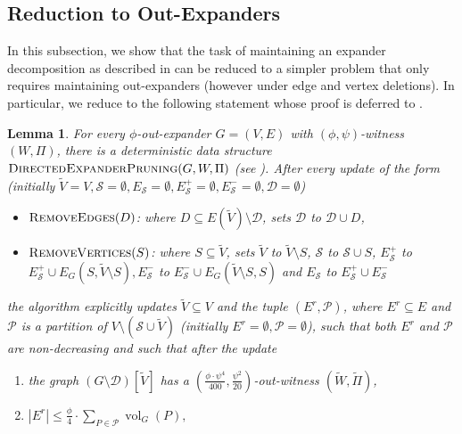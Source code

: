 \documentclass[11pt]{article}
\newtheorem{lemma}[theorem]{Lemma}
\begin{document}
\subsection{Reduction to Out-Expanders}

In this subsection, we show that the task of maintaining an expander decomposition as described in  can be reduced to a simpler problem that only requires maintaining out-expanders (however under edge and vertex deletions). In particular, we reduce to the following statement whose proof is deferred to .

\begin{lemma}\label{lm:DirectedExpanderDecomp}For every $\phi$-out-expander $G = (V, E)$ with $(\phi,\psi)$-witness $(W, \Pi)$, there is a deterministic data structure $\textsc{DirectedExpanderPruning}(G, W, \Pi)$ (see ). After every update of the form (initially $\tilde{V} = V, \mathcal{S} = \emptyset, E_{\mathcal{S}} = \emptyset, E_{\mathcal{S}}^+ = \emptyset, E_{\mathcal{S}}^- = \emptyset, \mathcal{D} = \emptyset$)
\begin{itemize}
    \item $\textsc{RemoveEdges}(D)$: where $D \subseteq E(\tilde{V}) \setminus \mathcal{D}$, sets $\mathcal{D}$ to $\mathcal{D} \cup D$,
    \item $\textsc{RemoveVertices}(S)$: where $S \subseteq \tilde{V}$, sets $\tilde{V}$ to $\tilde{V} \setminus S$, $\mathcal{S}$ to $\mathcal{S} \cup S$, $E_{\mathcal{S}}^+$ to $E_{\mathcal{S}}^+ \cup E_G(S, \tilde{V} \setminus S), E_{\mathcal{S}}^-$ to $E_{\mathcal{S}}^- \cup E_G(\tilde{V} \setminus S, S)$ and $E_{\mathcal{S}}$ to $E_{\mathcal{S}}^+ \cup E_{\mathcal{S}}^-$
\end{itemize}
the algorithm explicitly updates $\tilde{V} \subseteq V$ and the tuple $(E^r, \mathcal{P})$, where $E^r \subseteq E$ and $\mathcal{P}$ is a partition of $V \setminus \left(\mathcal{S} \cup \tilde{V}\right)$ (initially $E^r = \emptyset, \mathcal{P} = \emptyset$), such that both $E^r$ and $\mathcal{P}$ are non-decreasing and such that after the update 
\begin{enumerate}
    \item \label{itm:DEP-lm1} the graph $\left(G \setminus \mathcal{D}\right)\left[\tilde{V}\right]$ has a $\left(\frac{\phi \cdot \psi^4}{400}, \frac{\psi^2}{20}\right)$-out-witness $(\tilde{W}, \tilde{\Pi})$,
    \item \label{itm:DEP-lm2} $|E^r| \leq \frac{\phi}{4} \cdot \sum_{P \in \mathcal{P}} \operatorname{vol}_G(P),$

\end{enumerate}
\end{lemma}
\end{document}
